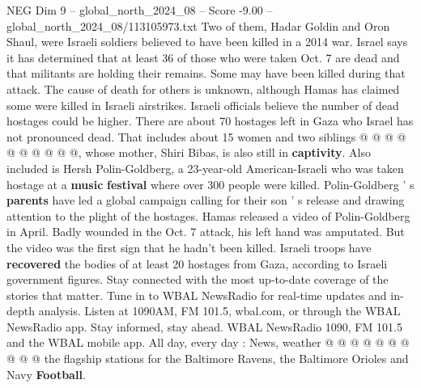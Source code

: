 \begin{textsample}{NEG Dim 9 – global\_north\_2024\_08 – Score -9.00 – global\_north\_2024\_08/113105973.txt}
Two of them, Hadar Goldin and Oron Shaul, were Israeli soldiers believed to have been killed in a 2014 war.
Israel says it has determined that at least 36 of those who were taken Oct. 7 are dead and that militants are holding their remains.
Some may have been killed during that attack.
The cause of death for others is unknown, although Hamas has claimed some were killed in Israeli airstrikes.
Israeli officials believe the number of dead hostages could be higher.
There are about 70 hostages left in Gaza who Israel has not pronounced dead.
That includes about 15 women and two siblings @ @ @ @ @ @ @ @ @ @, whose mother, Shiri Bibas, is also still in \textbf{captivity}.
Also included is Hersh Polin-Goldberg, a 23-year-old American-Israeli who was taken hostage at a \textbf{music} \textbf{festival} where over 300 people were killed.
Polin-Goldberg ' s \textbf{parents} have led a global campaign calling for their son ' s release and drawing attention to the plight of the hostages.
Hamas released a video of Polin-Goldberg in April.
Badly wounded in the Oct. 7 attack, his left hand was amputated.
But the video was the first sign that he hadn't been killed.
Israeli troops have \textbf{recovered} the bodies of at least 20 hostages from Gaza, according to Israeli government figures.
Stay connected with the most up-to-date coverage of the stories that matter.
Tune in to WBAL NewsRadio for real-time updates and in-depth analysis.
Listen at 1090AM, FM 101.5, wbal.com, or through the WBAL NewsRadio app.
Stay informed, stay ahead.
WBAL NewsRadio 1090, FM 101.5 and the WBAL mobile app.
All day, every day : News, weather @ @ @ @ @ @ @ @ @ @ the flagship stations for the Baltimore Ravens, the Baltimore Orioles and Navy \textbf{Football}.

\end{textsample}
